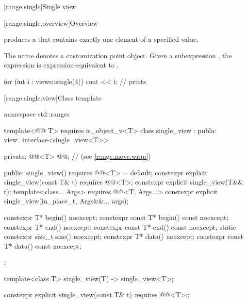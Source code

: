[range.single]{Single view}

[range.single.overview]{Overview}

\pnum
{} produces a  that contains
exactly one element of a specified value.

\pnum
{}%
The name  denotes a
customization point object.
Given a subexpression , the expression
 is expression-equivalent to
.

\pnum
\begin{example}
\begin{codeblock}
for (int i : views::single(4))
  cout << i;        // prints 
\end{codeblock}
\end{example}

[range.single.view]{Class template }

%
\begin{codeblock}
namespace std::ranges {
  template<@@ T>
    requires is_object_v<T>
  class single_view : public view_interface<single_view<T>> {
  private:
    @@<T> @@;              // \expos{} (see \ref{range.move.wrap})

  public:
    single_view() requires @@<T> = default;
    constexpr explicit single_view(const T& t) requires @@<T>;
    constexpr explicit single_view(T&& t);
    template<class... Args>
      requires @@<T, Args...>
    constexpr explicit single_view(in_place_t, Args&&... args);

    constexpr T* begin() noexcept;
    constexpr const T* begin() const noexcept;
    constexpr T* end() noexcept;
    constexpr const T* end() const noexcept;
    static constexpr size_t size() noexcept;
    constexpr T* data() noexcept;
    constexpr const T* data() const noexcept;
  };

  template<class T>
    single_view(T) -> single_view<T>;
}
\end{codeblock}

%
\begin{itemdecl}
constexpr explicit single_view(const T& t) requires @@<T>;;
\end{itemdecl}

